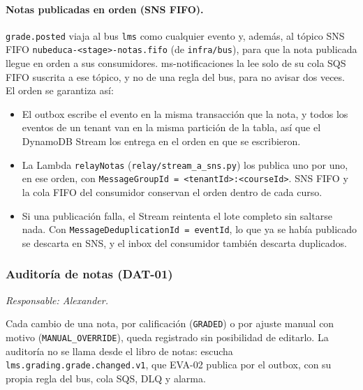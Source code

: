 \paragraph{Notas publicadas en orden (SNS FIFO).} \texttt{grade.posted} viaja al bus \texttt{lms} como
cualquier evento y, además, al tópico SNS FIFO \texttt{nubeduca-<stage>-notas.fifo} (de \texttt{infra/bus}),
para que la nota publicada llegue en orden a sus consumidores. ms-notificaciones la lee solo de su cola
SQS FIFO suscrita a ese tópico, y no de una regla del bus, para no avisar dos veces. El orden se garantiza
así:
\begin{itemize}
  \item El outbox escribe el evento en la misma transacción que la nota, y todos los eventos de un tenant van
        en la misma partición de la tabla, así que el DynamoDB Stream los entrega en el orden en que se
        escribieron.
  \item La Lambda \texttt{relayNotas} (\texttt{relay/stream\_a\_sns.py}) los publica uno por uno, en ese
        orden, con \texttt{MessageGroupId = <tenantId>:<courseId>}. SNS FIFO y la cola FIFO del consumidor
        conservan el orden dentro de cada curso.
  \item Si una publicación falla, el Stream reintenta el lote completo sin saltarse nada. Con
        \texttt{MessageDeduplicationId = eventId}, lo que ya se había publicado se descarta en SNS, y el
        inbox del consumidor también descarta duplicados.
\end{itemize}

\subsubsection{Auditoría de notas (DAT-01)}
\textit{Responsable: Alexander.}

Cada cambio de una nota, por calificación (\texttt{GRADED}) o por ajuste manual con motivo
(\texttt{MANUAL\_OVERRIDE}), queda registrado sin posibilidad de editarlo. La auditoría no se llama
desde el libro de notas: escucha \texttt{lms.grading.grade.changed.v1}, que EVA-02 publica por el outbox,
con su propia regla del bus, cola SQS, DLQ y alarma.

